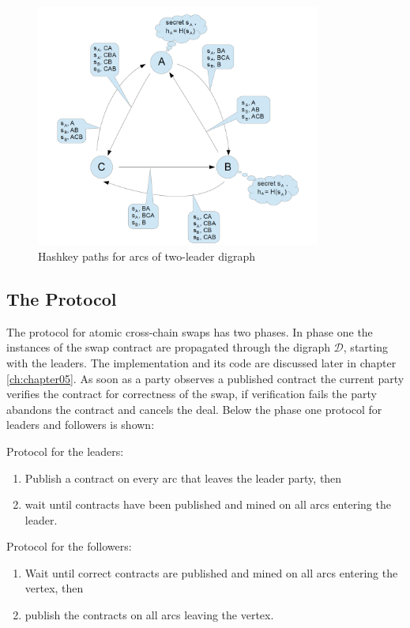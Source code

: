\begin{figure}[h]
	\includegraphics[height=8cm]{hashkey_paths}	%
	\caption{Hashkey paths for arcs of two-leader digraph}
	\label{fig:hashkey_paths}
\end{figure}

\subsection{The Protocol}
\label{subsec:background:second_section:protocol}
The protocol for atomic cross-chain swaps has two phases. In phase one the instances of the swap contract are propagated through the digraph $\mathcal{D}$, starting with the leaders. The implementation and its code are discussed later in chapter \ref{ch:chapter05}. As soon as a party observes a published contract the current party verifies the contract for correctness of the swap, if verification fails the party abandons the contract and cancels the deal. Below the phase one protocol for leaders and followers is shown: \newline

Protocol for the leaders:
\begin{enumerate}
	\item Publish a contract on every arc that leaves the leader party, then
	\item wait until contracts have been published and mined on all arcs entering the leader.
\end{enumerate}

Protocol for the followers:
\begin{enumerate}
	\item Wait until correct contracts are published and mined on all arcs entering the vertex, then
	\item publish the contracts on all arcs leaving the vertex.
\end{enumerate}

